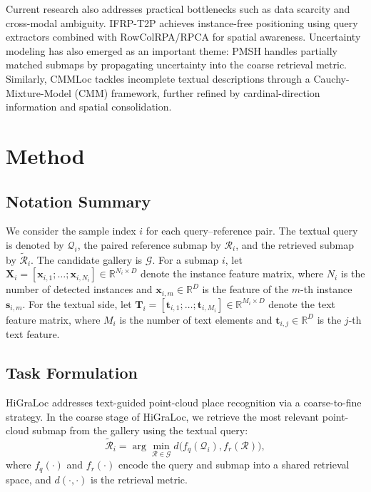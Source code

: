 \documentclass{article}
\begin{document}
Current research also addresses practical bottlenecks such as data scarcity and cross-modal ambiguity. IFRP-T2P \cite{wang2024instance} achieves instance-free positioning using query extractors combined with RowColRPA/RPCA for spatial awareness. Uncertainty modeling has also emerged as an important theme: PMSH \cite{feng2025partially} handles partially matched submaps by propagating uncertainty into the coarse retrieval metric. Similarly, CMMLoc \cite{xu2025cmmloc} tackles incomplete textual descriptions through a Cauchy-Mixture-Model (CMM) framework, further refined by cardinal-direction information and spatial consolidation.
\section{Method}
\subsection{Notation Summary}
We consider the sample index $i$ for each query--reference pair. The textual query is denoted by $\mathcal{Q}_i$, the paired reference submap by $\mathcal{R}_i$, and the retrieved submap by $\tilde{\mathcal{R}}_i$. The candidate gallery is $\mathcal{G}$. For a submap $i$, let $\mathbf{X}_i=[\mathbf{x}_{i,1};\dots;\mathbf{x}_{i,N_i}]\in\mathbb{R}^{N_i\times D}$ denote the instance feature matrix, where $N_i$ is the number of detected instances and $\mathbf{x}_{i,m}\in\mathbb{R}^D$ is the feature of the $m$-th instance $\mathbf{s}_{i,m}$. For the textual side, let $\mathbf{T}_i=[\mathbf{t}_{i,1};\dots;\mathbf{t}_{i,M_i}]\in\mathbb{R}^{M_i\times D}$ denote the text feature matrix, where $M_i$ is the number of text elements and $\mathbf{t}_{i,j}\in\mathbb{R}^D$ is the $j$-th text feature.
\subsection{Task Formulation}
HiGraLoc addresses text-guided point-cloud place recognition via a coarse-to-fine strategy. In the coarse stage of HiGraLoc, we retrieve the most relevant point-cloud submap from the gallery using the textual query:
\begin{equation}
\tilde{\mathcal{R}}_i = \arg\min_{\mathcal{R} \in \mathcal{G}} d\bigl(f_q(\mathcal{Q}_i), f_r(\mathcal{R})\bigr),
\label{eq:task_obj_retrieval}
\end{equation}
where $f_q(\cdot)$ and $f_r(\cdot)$ encode the query and submap into a shared retrieval space, and $d(\cdot,\cdot)$ is the retrieval metric. 
\end{document}
